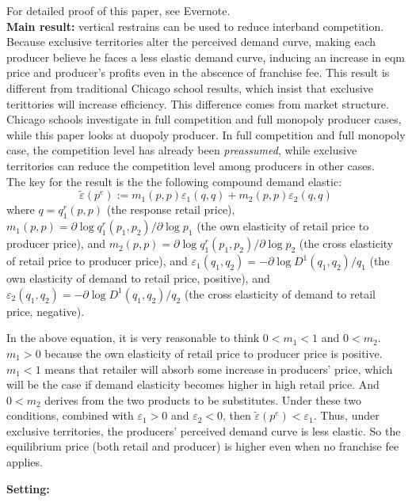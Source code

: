 \documentclass{book}
\theoremstyle{plain}
\theoremstyle{definition}
\begin{document}
\textbf{}

For detailed proof of this paper, see Evernote.\\

\textbf{Main result:}
vertical restrains can be used to reduce interband competition. Because exclusive territories alter the perceived demand curve, making each producer believe he faces a less elastic demand curve, inducing an increase in eqm price and producer's profits even in the abscence of franchise fee. This result is different from traditional Chicago school results, which insist that exclusive terittories will increase efficiency. This difference comes from market structure. Chicago schools investigate in full competition and full monopoly producer cases, while this paper looks at duopoly producer. In full competition and full monopoly case, the competition level has already been \textit{preassumed}, while exclusive territories can reduce the competition level among producers in other cases.\\

The key for the result is the the following compound demand elastic:
\[\tilde\varepsilon(p^e):=m_1(p,p)\varepsilon_1(q,q)+m_2(p,p)\varepsilon_2(q,q) \]
where $q=q_1^r(p,p)$ (the response retail price),
$m_1(p,p)=\partial \log q_1^r(p_1,p_2)/\partial \log p_1$ (the own elasticity of retail price to producer price),
and  $m_2(p,p)=\partial \log q_1^r(p_1,p_2)/\partial \log p_2$ (the cross elasticity of retail price to producer price),
and $\varepsilon_1(q_1,q_2)=-\partial \log D^1(q_1,q_2)/q_1$ (the own elasticity of demand to retail price, positive),
and $\varepsilon_2(q_1,q_2)=-\partial \log D^1(q_1,q_2)/q_2$ (the cross elasticity of demand to retail price, negative).

In the above equation, it is very reasonable to think $0<m_1<1$ and $0<m_2$. $m_1>0$ because the own elasticity of retail price to producer price is positive. $m_1<1$ means that retailer will absorb some increase in producers' price, which will be the case if demand elasticity becomes higher in high retail price. And $0<m_2$ derives from the two products to be substitutes. Under these two conditions, combined with $\varepsilon_1>0$ and $\varepsilon_2<0$, then $\tilde\varepsilon(p^e)<\varepsilon_1$. Thus, under exclusive territories, the producers' perceived demand curve is less elastic. So the equilibrium price (both retail and producer) is higher even when no franchise fee applies.

\noindent
\textbf{Setting:}
\end{document}
